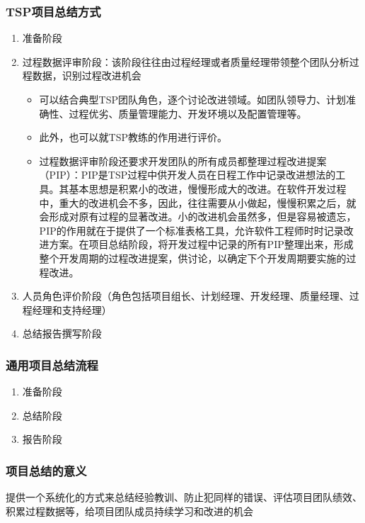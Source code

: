 \subsubsection{TSP项目总结方式}
\begin{enumerate}[label=\arabic*.]
    \item 准备阶段
    \item 过程数据评审阶段：该阶段往往由过程经理或者质量经理带领整个团队分析过程数据，识别过程改进机会
    \begin{itemize}
        \item 可以结合典型TSP团队角色，逐个讨论改进领域。如团队领导力、计划准确性、过程优劣、质量管理能力、开发环境以及配置管理等。
        \item 此外，也可以就TSP教练的作用进行评价。
        \item 过程数据评审阶段还要求开发团队的所有成员都整理过程改进提案（PIP）：PIP是TSP过程中供开发人员在日程工作中记录改进想法的工具。其基本思想是积累小的改进，慢慢形成大的改进。在软件开发过程中，重大的改进机会不多，因此，往往需要从小做起，慢慢积累之后，就会形成对原有过程的显著改进。小的改进机会虽然多，但是容易被遗忘，PIP的作用就在于提供了一个标准表格工具，允许软件工程师时时记录改进方案。在项目总结阶段，将开发过程中记录的所有PIP整理出来，形成整个开发周期的过程改进提案，供讨论，以确定下个开发周期要实施的过程改进。
    \end{itemize}
    \item 人员角色评价阶段（角色包括项目组长、计划经理、开发经理、质量经理、过程经理和支持经理）
    \item 总结报告撰写阶段
\end{enumerate}

\subsubsection{通用项目总结流程}
\vspace{-0.8em}
\begin{multicols}{3}
    \begin{enumerate}[label=\arabic*.]
        \item 准备阶段
        \item 总结阶段
        \item 报告阶段
    \end{enumerate}
\end{multicols}
\vspace{-1em}

\subsubsection{项目总结的意义}
提供一个系统化的方式来总结经验教训、防止犯同样的错误、评估项目团队绩效、积累过程数据等，给项目团队成员持续学习和改进的机会

